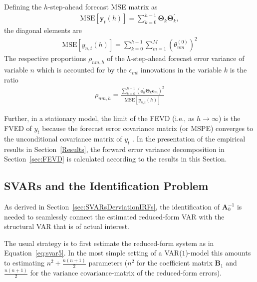 \documentclass[a4paper,11pt,listof=nochaptergap,oneside,pointednumbers,bibtotoc,bigheadings,liststotoc,hidelinks]{scrbook}
\theoremstyle{mysatz}
\theoremstyle{mydefinition}
\theoremstyle{mytheorem}
\theoremstyle{mybemerkung}
\newcommand{\vect}[1]{\boldsymbol{\mathbf{#1}}}
\begin{document}
Defining the $h$-step-ahead forecast MSE matrix as
\begin{equation} \label{eq:FVED4}
\begin{split}
 		\text{MSE}[\vect{y}_t(h)] = \sum\limits_{k=0}^{h-1} \vect{\Theta}_k\vect{\Theta}_k^',
\end{split}								
\end{equation}
the diagonal elements are
\begin{equation} \label{eq:FVED5}
\begin{split}
 		\text{MSE}[y_{n,t}(h)] = \sum\limits_{k=0}^{h-1}\sum\limits_{m=1}^{M}\left(\theta_{nm}^{(0)}\right)^2
\end{split}								
\end{equation}
The respective proportions $\rho_{nm,h}$ of the $h$-step-ahead forecast error variance of variable $n$ which is accounted for by the $\epsilon_{mt}$ innovations in the variable $k$ is the ratio
\begin{equation} \label{eq:FVED6}
\begin{split}
 		\rho_{nm,h} = \frac{\sum\limits_{k=0}^{h-1} (\vect{e}_n^'\vect{\Theta}_k\vect{e}_m)^2}{\text{MSE}[y_{n,t}(h)]}
\end{split}								
\end{equation}

Further, in a stationary model, the limit of the FEVD (i.e., as $h \rightarrow \infty$) is the FVED of $y_t$ because the forecast error covariance matrix (or MSPE) converges to the unconditional covariance matrix of $y_t$ \citep{lutkepohlkilian:17}. In the presentation of the empirical results in Section~\ref{Results}, the forward error variance decomposition in Section~\ref{sec:FEVD} is calculated according to the results in this Section.


\subsection{SVARs and the Identification Problem}
\label{sec:strcuturalVARsIdentification}
As derived in Section~\ref{sec:SVARsDerviationIRFs}, the identification of $\vect{A}_0^{-1}$ is needed to seamlessly connect the estimated reduced-form VAR with the structural VAR that is of actual interest.

The usual strategy is to first estimate the reduced-form system as in Equation~\ref{eq:svar5}. In the most simple setting of a VAR($1$)-model this amounts to estimating $n^2 + \frac{n(n+1)}{2}$ parameters ($n^2$ for the coefficient matrix $\vect{B}_1$ and $\frac{n(n+1)}{2}$ for the variance covariance-matrix of the reduced-form errors). 
\end{document}
